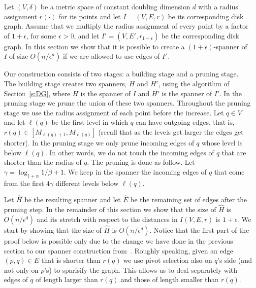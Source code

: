 \documentclass[proceedings]{stacs}
\theoremstyle{plain}\newtheorem{satz}[thm]{Satz}
\theoremstyle{definition}\newtheorem{crucial}[thm]{Crucial Definition}
\newcommand{\eps}{\epsilon}
\begin{document}
Let $(V,\delta)$ be a metric space of constant doubling dimension
$d$ with a radius assignment $r(\cdot)$ for its points and let
$I=(V,E,r)$ be its corresponding disk graph. Assume that we
multiply the radius assignment of every point by a factor of
$1+\eps$, for some $\eps>0$, and let $I'=(V,E',r_{1+\eps})$ be the
corresponding disk graph. In this section we show that it is
possible to create a $(1+\eps)$-spanner of $I$ of size
$O(n/\eps^d)$ if we are allowed to use edges of $I'$.

Our construction consists of two stages: a building stage and a
pruning stage. The building stage creates two spanners, $H$ and
$H'$, using the algorithm of Section~\ref{s:DG}, where $H$ is the
spanner of $I$ and $H'$ is the spanner of $I'$. In the pruning
stage we prune the union of these two spanners. Throughout the
pruning stage we use the radius assignment of each point before
the increase. Let $q\in V$ and let $\ell(q)$ be the first level in
which $q$ can have outgoing edges, that is, $r(q)\in
[M_{\ell(q)+1},M_{\ell(q)}]$ (recall that as the levels get larger
the edges get shorter). In the pruning stage we only prune
incoming edges of $q$ whose level is below $\ell(q)$. In other
words, we do not touch the incoming edges of $q$ that are shorter
than the radius of $q$. The pruning is done as follow. Let $\gamma
= \log_{1+\alpha}{1/\beta}+1$. We keep in the spanner the incoming
edges of $q$ that come from the first $4\gamma$ different levels
below $\ell(q)$.

Let $\hat{H}$ be the resulting spanner and let $\hat{E}$ be the
remaining set of edges after the pruning step. In the remainder of
this section we show that the size of $\hat{H}$ is
$O(n/\epsilon^d)$ and its stretch with respect to the distances in
$I(V,E,r)$ is $1+\eps$. We start by showing that the size of
$\hat{H}$ is $O(n/\epsilon^d)$. Notice that the first part of the
proof below is possible only due to the change we have done in the
previous section to our spanner construction from~\cite{PeRo08}.
Roughly speaking, given an edge $(p,q) \in E$ that is shorter than
$r(q)$ we use pivot selection also on $q$'s side (and not only on
$p$'s) to sparisify the graph. This allows us to deal separately
with edges of $q$ of length larger than $r(q)$ and those of length
smaller than $r(q)$.
\end{document}
